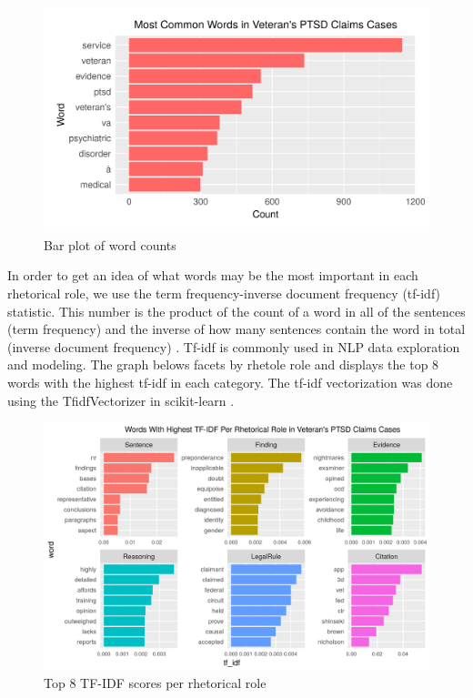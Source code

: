 \documentclass[11pt]{article}
\begin{document}
\begin{figure}[h]
  \centering
  \includegraphics[scale=0.7]{images/word_count}
  \caption{Bar plot of word counts}
  \label{wordcount}
\end{figure}

In order to get an idea of what words may be the most important in each rhetorical role, we use the term frequency-inverse document frequency (tf-idf) statistic. This number is the product of the count of a word in all of the sentences (term frequency) and the inverse of how many sentences contain the word in total (inverse document frequency) \cite{christopherdmanning2008introduction}. Tf-idf is commonly used in NLP data exploration and modeling. The graph belows facets by rhetole role and displays the top 8 words with the highest tf-idf in each category. The tf-idf vectorization was done using the TfidfVectorizer in scikit-learn \cite{scikit-learn}.

\begin{figure}[h]
  \centering
  \includegraphics[scale=0.85]{images/facet_tf-idf1}
  \caption{Top 8 TF-IDF scores per rhetorical role}
  \label{tfidfcount}
\end{figure}
\end{document}
